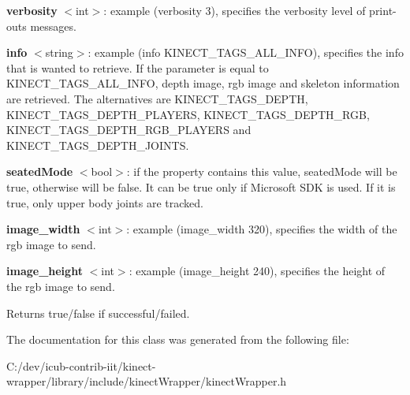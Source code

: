{\bfseries verbosity} $<$int$>$\+: example (verbosity 3), specifies the verbosity level of print-\/outs messages.

{\bfseries info} $<$string$>$\+: example (info K\+I\+N\+E\+C\+T\+\_\+\+T\+A\+G\+S\+\_\+\+A\+L\+L\+\_\+\+I\+N\+FO), specifies the info that is wanted to retrieve. If the parameter is equal to K\+I\+N\+E\+C\+T\+\_\+\+T\+A\+G\+S\+\_\+\+A\+L\+L\+\_\+\+I\+N\+FO, depth image, rgb image and skeleton information are retrieved. The alternatives are K\+I\+N\+E\+C\+T\+\_\+\+T\+A\+G\+S\+\_\+\+D\+E\+P\+TH, K\+I\+N\+E\+C\+T\+\_\+\+T\+A\+G\+S\+\_\+\+D\+E\+P\+T\+H\+\_\+\+P\+L\+A\+Y\+E\+RS, K\+I\+N\+E\+C\+T\+\_\+\+T\+A\+G\+S\+\_\+\+D\+E\+P\+T\+H\+\_\+\+R\+GB, K\+I\+N\+E\+C\+T\+\_\+\+T\+A\+G\+S\+\_\+\+D\+E\+P\+T\+H\+\_\+\+R\+G\+B\+\_\+\+P\+L\+A\+Y\+E\+RS and K\+I\+N\+E\+C\+T\+\_\+\+T\+A\+G\+S\+\_\+\+D\+E\+P\+T\+H\+\_\+\+J\+O\+I\+N\+TS.

{\bfseries seated\+Mode} $<$bool$>$\+: if the property contains this value, seated\+Mode will be true, otherwise will be false. It can be true only if Microsoft S\+DK is used. If it is true, only upper body joints are tracked.

{\bfseries image\+\_\+width} $<$int$>$\+: example (image\+\_\+width 320), specifies the width of the rgb image to send.

{\bfseries image\+\_\+height} $<$int$>$\+: example (image\+\_\+height 240), specifies the height of the rgb image to send.

\begin{DoxyReturn}{Returns}
true/false if successful/failed. 
\end{DoxyReturn}


The documentation for this class was generated from the following file\+:\begin{DoxyCompactItemize}
\item 
C\+:/dev/icub-\/contrib-\/iit/kinect-\/wrapper/library/include/kinect\+Wrapper/kinect\+Wrapper.\+h\end{DoxyCompactItemize}
